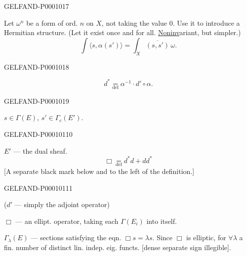 \begin{GelfandAdjacentEvidence}{GELFAND-P000101}{7}


Let $\omega^n$ be a form of ord. $n$ on $X$, not taking the value $0$.
Use it to introduce a Hermitian structure. (Let it
exist once and for all. \underline{Noninv}ariant, but simpler.)
\begin{equation*}
\int\langle s,\alpha(s')\rangle=\int_X\overline{(s,s')}\,\omega.
\end{equation*}
\end{GelfandAdjacentEvidence}
\begin{GelfandAdjacentEvidence}{GELFAND-P000101}{8}

\begin{equation*}d^*\underset{\mathrm{def}}{=}\alpha^{-1}\cdot d'\circ\alpha.\end{equation*}
\end{GelfandAdjacentEvidence}
\begin{GelfandAdjacentEvidence}{GELFAND-P000101}{9}

$s\in\Gamma(E)$, $s'\in\Gamma_c(E')$.
\end{GelfandAdjacentEvidence}
\begin{GelfandAdjacentEvidence}{GELFAND-P000101}{10}


$E'$ — the dual sheaf.
\begin{equation*}\Box\underset{\mathrm{def}}{=}d^*d+dd^*\end{equation*}
[A separate black mark below and to the left of the definition.]
\end{GelfandAdjacentEvidence}
\begin{GelfandAdjacentEvidence}{GELFAND-P000101}{11}

($d'$ — simply the adjoint operator)

$\Box$ — an ellipt. operator, taking each $\Gamma(E_i)$ into itself.

$\Gamma_\lambda(E)$ — sections satisfying the eqn. $\Box s=\lambda s$.
Since $\Box$ is elliptic, for $\forall\lambda$ a fin. number of distinct lin. indep. eig. functs.
[dense separate sign illegible].
\end{GelfandAdjacentEvidence}
